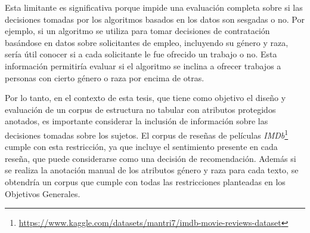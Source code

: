 Esta limitante es significativa porque impide una evaluaci\'on completa sobre si las decisiones tomadas por los algoritmos basados 
en los datos son sesgadas o no. Por ejemplo, si un algoritmo se utiliza para tomar decisiones de contrataci\'on bas\'andose en datos
sobre solicitantes de empleo, incluyendo su g\'enero y raza, ser\'ia \'util conocer si a cada solicitante le fue ofrecido 
un trabajo o no. Esta informaci\'on permitir\'ia evaluar si el algoritmo se inclina a ofrecer trabajos a personas con cierto g\'enero o raza
por encima de otras.

Por lo tanto, en el contexto de esta tesis, que tiene como objetivo el dise\~no y evaluaci\'on de un corpus de estructura no tabular
con atributos protegidos anotados, es importante considerar la inclusi\'on de informaci\'on sobre las decisiones tomadas sobre los sujetos.
El corpus de rese\~nas de pel\'iculas \emph{IMDb}\footnote{\url{https://www.kaggle.com/datasets/mantri7/imdb-movie-reviews-dataset}}
cumple con esta restricci\'on, ya que incluye el sentimiento presente en cada rese\~na, que puede considerarse como una decisi\'on de 
recomendaci\'on. Adem\'as si se realiza la anotaci\'on manual de los atributos g\'enero y raza para cada texto, se obtendr\'ia un corpus
que cumple con todas las restricciones planteadas en los Objetivos Generales.